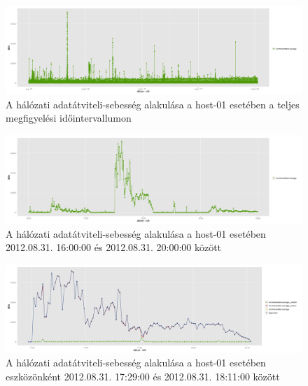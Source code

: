 \documentclass[a4paper,10pt,titlepage]{article}
\begin{document}
\begin{figure}[h!]
\centering
\includegraphics[width=1.00\textwidth]{figures/net_transmitted_average-20120826230140-20120924083120.png}
\caption{ A hálózati adatátviteli-sebesség alakulása a host-01 esetében a teljes megfigyelési időintervallumon \label{fig:net_transmitted_average-01}}
\end{figure}

\begin{figure}[h!]
\centering
\includegraphics[width=1.00\textwidth]{figures/net_transmitted_average-20120831160000-20120831200000.png}
\caption{ A hálózati adatátviteli-sebesség alakulása a host-01 esetében 2012.08.31. 16:00:00 és 2012.08.31. 20:00:00 között \label{fig:net_transmitted_average-02}}
\end{figure}

\begin{figure}[h!]
\centering
\includegraphics[width=1.00\textwidth]{figures/net_transmitted_average_dev-20120831172900-20120831181100.png}
\caption{ A hálózati adatátviteli-sebesség alakulása a host-01 esetében eszközönként 2012.08.31. 17:29:00 és 2012.08.31. 18:11:00 között \label{fig:net_transmitted_average_dev}}
\end{figure}
\end{document}
